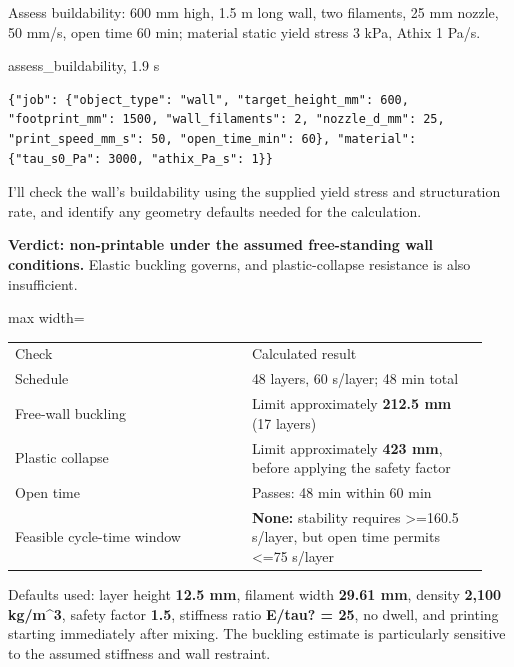 \begin{userbox}
Assess buildability: 600 mm high, 1.5 m long wall, two filaments, 25 mm nozzle, 50 mm/s, open time 60 min; material static yield stress 3 kPa, Athix 1 Pa/s.
\end{userbox}
\begin{toolbox}{assess\_buildability, 1.9 s}
\begin{lstlisting}[style=argstyle]
{"job": {"object_type": "wall", "target_height_mm": 600, "footprint_mm": 1500, "wall_filaments": 2, "nozzle_d_mm": 25, "print_speed_mm_s": 50, "open_time_min": 60}, "material": {"tau_s0_Pa": 3000, "athix_Pa_s": 1}}
\end{lstlisting}
\end{toolbox}
\begin{agentbox}
I'll check the wall's buildability using the supplied yield stress and structuration rate, and identify any geometry defaults needed for the calculation.\par
\textbf{Verdict: non-printable under the assumed free-standing wall conditions.} Elastic buckling governs, and plastic-collapse resistance is also insufficient.\par
\par
\par\smallskip\begin{adjustbox}{max width=\linewidth}\begin{tabular}{p{0.47\linewidth}p{0.47\linewidth}}
Check & Calculated result \\
Schedule & 48 layers, 60 s/layer; 48 min total \\
Free-wall buckling & Limit approximately \textbf{212.5 mm} (17 layers) \\
Plastic collapse & Limit approximately \textbf{423 mm}, before applying the safety factor \\
Open time & Passes: 48 min within 60 min \\
Feasible cycle-time window & \textbf{None:} stability requires >=160.5 s/layer, but open time permits <=75 s/layer \\
\end{tabular}\end{adjustbox}\par\smallskip
\par
Defaults used: layer height \textbf{12.5 mm}, filament width \textbf{29.61 mm}, density \textbf{2,100 kg/m\textasciicircum{}3}, safety factor \textbf{1.5}, stiffness ratio \textbf{E/tau? = 25}, no dwell, and printing starting immediately after mixing. The buckling estimate is particularly sensitive to the assumed stiffness and wall restraint.\par

\end{agentbox}
